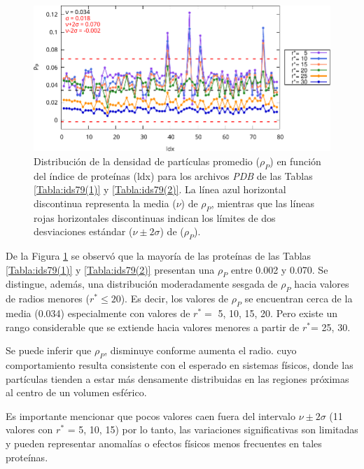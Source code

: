  	\begin{figure}[H]
 		\centering
 		\includegraphics[width=\linewidth]{graphs/ldx-dp.pdf}
 		\caption{Distribuci\'{o}n de la densidad de 
 			part\'{i}culas promedio ($\rho_P$) en funci\'{o}n del 
 			\'{i}ndice de prote\'{i}nas (ldx) para los 
 			archivos \emph{PDB} de las Tablas 
 			\ref{Tabla:ids79(1)} y \ref{Tabla:ids79(2)}. La l\'{i}nea azul horizontal 
 			discontinua representa la media ($\nu$) de   
 			$\rho_P$, mientras que las l\'{i}neas rojas horizontales discontinuas indican los l\'{i}mites de dos desviaciones est\'{a}ndar (\(\nu \pm 2\sigma\)) de ($\rho_P$).}
 		\label{index-vs-density}
 	\end{figure}
 	
 	
 	De la Figura \ref{index-vs-density} se observ\'{o} que la mayor\'{i}a de las prote\'{i}nas de las Tablas \ref{Tabla:ids79(1)} y \ref{Tabla:ids79(2)}  presentan una $\rho_P$ entre 0.002 y 0.070. 
 	Se distingue, adem\'{a}s, una distribuci\'{o}n moderadamente sesgada de $\rho_P$ hacia valores de radios menores ($r^* \leq 20$). Es decir, los valores de \(\rho_P\) se encuentran cerca de la media (0.034) especialmente con valores de $r^*{=}$ 5, 10, 15, 20. Pero existe un rango considerable que se extiende hacia valores menores a partir de $r^*$= 25, 30.
 	
 	
 	Se puede inferir que $\rho_P$, disminuye conforme aumenta el radio. cuyo comportamiento resulta consistente con el esperado en sistemas f\'{i}sicos, donde las part\'{i}culas tienden a estar m\'{a}s densamente distribuidas en las regiones pr\'{o}ximas al centro de un volumen esf\'{e}rico.
 	
 	Es importante mencionar que pocos valores caen fuera del intervalo $\nu \pm 2\sigma$ (11 valores con $r^*$ = 5, 10, 15) por lo tanto, las variaciones significativas son limitadas y pueden representar anomal\'{i}as o efectos f\'{i}sicos menos frecuentes en tales prote\'{i}nas.
 	
